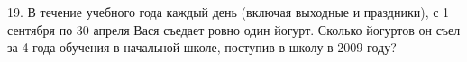 19. В течение учебного года каждый день (включая выходные и праздники), с 1 сентября по 30 апреля Вася съедает ровно один йогурт. Сколько йогуртов он съел за 4 года обучения в начальной школе, поступив в школу в 2009 году?\\
